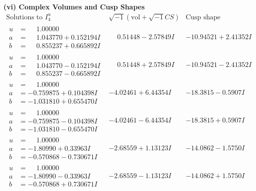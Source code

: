 \documentclass[1p]{elsarticle_modified}
\theoremstyle{definition}
\newcommand{\I}{\sqrt{-1}}
\begin{document}
\newpage\flushleft \textbf{(vi) Complex Volumes and Cusp Shapes}
$$\begin{array}{c|c|c}  
\text{Solutions to }I^u_{4}& \I (\text{vol} + \sqrt{-1}CS) & \text{Cusp shape}\\
 \hline 
\begin{aligned}
u &= \phantom{-}1.00000\phantom{ +0.000000I} \\
a &= \phantom{-}1.043770 + 0.152194 I \\
b &= \phantom{-}0.855237 + 0.665892 I\end{aligned}
 & \phantom{-}0.51448 - 2.57849 I & -10.94521 + 2.41352 I \\ \hline\begin{aligned}
u &= \phantom{-}1.00000\phantom{ +0.000000I} \\
a &= \phantom{-}1.043770 - 0.152194 I \\
b &= \phantom{-}0.855237 - 0.665892 I\end{aligned}
 & \phantom{-}0.51448 + 2.57849 I & -10.94521 - 2.41352 I \\ \hline\begin{aligned}
u &= \phantom{-}1.00000\phantom{ +0.000000I} \\
a &= -0.759875 + 0.104398 I \\
b &= -1.031810 + 0.655470 I\end{aligned}
 & -4.02461 + 6.44354 I & -18.3815 - 0.5907 I \\ \hline\begin{aligned}
u &= \phantom{-}1.00000\phantom{ +0.000000I} \\
a &= -0.759875 - 0.104398 I \\
b &= -1.031810 - 0.655470 I\end{aligned}
 & -4.02461 - 6.44354 I & -18.3815 + 0.5907 I \\ \hline\begin{aligned}
u &= \phantom{-}1.00000\phantom{ +0.000000I} \\
a &= -1.80990 + 0.33963 I \\
b &= -0.570868 - 0.730671 I\end{aligned}
 & -2.68559 + 1.13123 I & -14.0862 - 1.5750 I \\ \hline\begin{aligned}
u &= \phantom{-}1.00000\phantom{ +0.000000I} \\
a &= -1.80990 - 0.33963 I \\
b &= -0.570868 + 0.730671 I\end{aligned}
 & -2.68559 - 1.13123 I & -14.0862 + 1.5750 I \\ \hline\begin{aligned}

\end{aligned}
\end{array}$$
\end{document}
